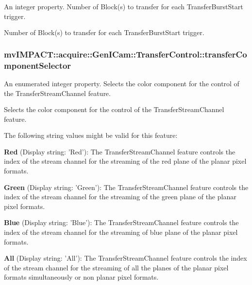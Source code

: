 An integer property. Number of Block(s) to transfer for each Transfer\+Burst\+Start trigger. 

Number of Block(s) to transfer for each Transfer\+Burst\+Start trigger. \hypertarget{classmv_i_m_p_a_c_t_1_1acquire_1_1_gen_i_cam_1_1_transfer_control_a4162691dbc0ef1d245d9af1943e3f8bf}{
\subsubsection[{transfer\+Component\+Selector}]{ mv\+I\+M\+P\+A\+C\+T\+::acquire\+::\+Gen\+I\+Cam\+::\+Transfer\+Control\+::transfer\+Component\+Selector}}\label{classmv_i_m_p_a_c_t_1_1acquire_1_1_gen_i_cam_1_1_transfer_control_a4162691dbc0ef1d245d9af1943e3f8bf}


An enumerated integer property. Selects the color component for the control of the Transfer\+Stream\+Channel feature. 

Selects the color component for the control of the Transfer\+Stream\+Channel feature.

The following string values might be valid for this feature\+:
\begin{DoxyItemize}
\item {\bfseries Red} (Display string\+: 'Red')\+: The Transfer\+Stream\+Channel feature controls the index of the stream channel for the streaming of the red plane of the planar pixel formats.
\item {\bfseries Green} (Display string\+: 'Green')\+: The Transfer\+Stream\+Channel feature controls the index of the stream channel for the streaming of the green plane of the planar pixel formats.
\item {\bfseries Blue} (Display string\+: 'Blue')\+: The Transfer\+Stream\+Channel feature controls the index of the stream channel for the streaming of blue plane of the planar pixel formats.
\item {\bfseries All} (Display string\+: 'All')\+: The Transfer\+Stream\+Channel feature controls the index of the stream channel for the streaming of all the planes of the planar pixel formats simultaneously or non planar pixel formats.
\end{DoxyItemize}

